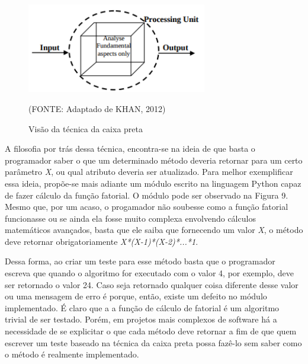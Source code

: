 \documentclass[
    12pt,       %
    openright,      %
    twoside,      %
    a4paper,      %
    english,      %
    french,       %
    spanish,      %
    brazil,       %
    ]{abntex2}
\begin{document}
              \begin{figure}[htbp]
                  \begin{center}
                      \includegraphics[width=0.7\textwidth]{img/blackbox.png}
                  \end{center}
              \caption{\label{fig:passaro}Visão da técnica da caixa preta}
              \begin{center}(FONTE: Adaptado de KHAN, 2012)\end{center}
              \end{figure}

              A filosofia por trás dessa técnica, encontra-se na ideia de que basta o programador
              saber o que um determinado método deveria retornar para um certo parâmetro
              \textit{X}, ou qual atributo deveria ser atualizado. Para melhor exemplificar essa
              ideia, propõe-se mais adiante um módulo escrito na linguagem Python capaz de fazer
              cálculo da função fatorial. O módulo pode ser observado na Figura 9. Mesmo que, por um
              acaso, o progamador não soubesse como a função fatorial funcionasse ou se ainda ela
              fosse muito complexa envolvendo cálculos matemáticos avançados, basta que ele saiba que
              fornecendo um valor \textit{X}, o método deve retornar obrigatoriamente
              \textit{X*(X-1)*(X-2)*...*1}.

              Dessa forma, ao criar um teste para esse método basta que o programador escreva que
              quando o algoritmo for executado com o valor 4, por exemplo, deve ser retornado
              o valor 24. Caso seja retornado qualquer coisa diferente desse valor ou uma mensagem
              de erro é porque, então, existe um defeito no módulo implementado. É claro que a
              a função de cálculo de fatorial é um algoritmo trivial de ser testado. Porém, em
              projetos mais complexos de software há a necessidade de se explicitar o que cada
              método deve retornar a fim de que quem escrever um teste baseado na técnica da caixa
              preta possa fazê-lo sem saber como o método é realmente implementado.
\end{document}
